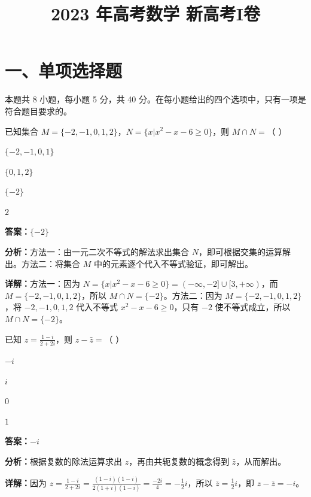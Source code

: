 ﻿\title{2023 年高考数学 新高考I卷}
\date{}
\maketitle

\section*{一、单项选择题}
本题共 8 小题，每小题 5 分，共 40 分。在每小题给出的四个选项中，只有一项是符合题目要求的。

\begin{question}[points=5]
已知集合 $M=\{-2,-1,0,1,2\}$，$N=\{x|x^2-x-6\geq 0\}$，则 $M\cap N=$（ ）
\begin{choices}
  \item $\{-2,-1,0,1\}$
  \item $\{0,1,2\}$
  \item $\{-2\}$
  \item $2$
\end{choices}
\begin{solution}
\textbf{答案：}$\{-2\}$

\textbf{分析：}方法一：由一元二次不等式的解法求出集合 $N$，即可根据交集的运算解出。方法二：将集合 $M$ 中的元素逐个代入不等式验证，即可解出。

\textbf{详解：}方法一：因为 $N=\{x|x^2-x-6\geq 0\}=(-\infty,-2]\cup[3,+\infty)$，而 $M=\{-2,-1,0,1,2\}$，所以 $M\cap N=\{-2\}$。方法二：因为 $M=\{-2,-1,0,1,2\}$，将 $-2,-1,0,1,2$ 代入不等式 $x^2-x-6\geq 0$，只有 $-2$ 使不等式成立，所以 $M\cap N=\{-2\}$。
\end{solution}
\end{question}

\begin{question}[points=5]
已知 $z=\frac{1-i}{2+2i}$，则 $z-\bar{z}=$（ ）
\begin{choices}
  \item $-i$
  \item $i$
  \item $0$
  \item $1$
\end{choices}
\begin{solution}
\textbf{答案：}$-i$

\textbf{分析：}根据复数的除法运算求出 $z$，再由共轭复数的概念得到 $\bar{z}$，从而解出。

\textbf{详解：}因为 $z=\frac{1-i}{2+2i}=\frac{(1-i)(1-i)}{2(1+i)(1-i)}=\frac{-2i}{4}=-\frac{1}{2}i$，所以 $\bar{z}=\frac{1}{2}i$，即 $z-\bar{z}=-i$。
\end{solution}
\end{question}

